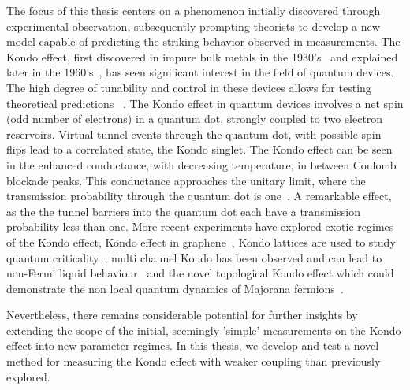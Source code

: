 The focus of this thesis centers on a phenomenon initially discovered through experimental observation, subsequently prompting theorists to develop a new model capable of predicting the striking behavior observed in measurements. The Kondo effect, first discovered in impure bulk metals in the 1930’s~\cite{de_haas} and explained later in the 1960’s~\cite{jun_kondo}, has seen significant interest in the field of quantum devices. The high degree of tunability and control in these devices allows for testing theoretical predictions ~\cite{costi_kondo_mv_eo_regime}. 
The Kondo effect in quantum devices involves a net spin (odd number of electrons) in a quantum dot, strongly coupled to two electron reservoirs. Virtual tunnel events through the quantum dot, with possible spin flips lead to a correlated state, the Kondo singlet. The Kondo effect can be seen in the enhanced conductance, with decreasing temperature, in between Coulomb blockade peaks. This conductance approaches the unitary limit, where the transmission probability through the quantum dot is one~\cite{kondo_unitary, kondo_unitary_theory, yigal_kondo}. A remarkable effect, as the the tunnel barriers into the quantum dot each have a transmission probability less than one. More recent experiments have explored exotic regimes of the Kondo effect, Kondo effect in graphene~\cite{kondo_graphene}, Kondo lattices are used to study quantum criticality~\cite{kondolattice}, multi channel Kondo has been observed and can lead to non-Fermi liquid
behaviour~\cite{potok_2ck, iftikhar_2ck, kirchner_2ck} and the novel topological Kondo effect which could demonstrate the non local quantum dynamics of Majorana fermions~\cite{topological_kondo_majorana, topological_kondo, kondo_topological}.

Nevertheless, there remains considerable potential for further insights by extending the scope of the initial, seemingly 'simple' measurements on the Kondo effect into new parameter regimes. In this thesis, we develop and test a novel method for measuring the Kondo effect with weaker coupling than previously explored.


